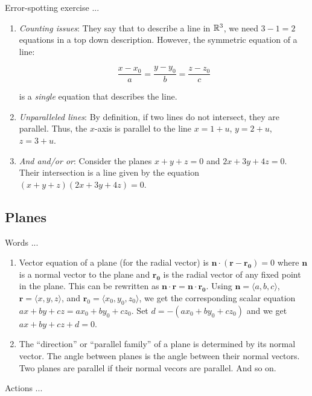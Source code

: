 \documentclass[10pt]{amsart}
\begin{document}
Error-spotting exercise ...

\begin{enumerate}
\item {\em Counting issues}: They say that to describe a line in
  $\mathbb{R}^3$, we need $3 - 1 = 2$ equations in a top down
  description. However, the symmetric equation of a line:

  $$\frac{x - x_0}{a} = \frac{y - y_0}{b} = \frac{z - z_0}{c}$$

  is a {\em single} equation that describes the line.
\item {\em Unparalleled lines}: By definition, if two lines do not
  intersect, they are parallel. Thus, the $x$-axis is parallel to the
  line $x = 1 + u$, $y = 2 + u$, $z = 3 + u$.
\item {\em And and/or or}: Consider the planes $x + y + z = 0$ and $2x
  + 3y + 4z = 0$. Their intersection is a line given by the equation
  $(x + y +z)(2x + 3y + 4z) = 0$.
\end{enumerate}

\subsection{Planes}

Words ...

\begin{enumerate}
\item Vector equation of a plane (for the radial vector) is
  $\mathbf{n} \cdot (\mathbf{r} - \mathbf{r_0}) = 0$ where
  $\mathbf{n}$ is a normal vector to the plane and $\mathbf{r_0}$ is
  the radial vector of any fixed point in the plane. This can be
  rewritten as $\mathbf{n} \cdot \mathbf{r} = \mathbf{n} \cdot
  \mathbf{r_0}$. Using $\mathbf{n} = \langle a,b,c \rangle$,
  $\mathbf{r} = \langle x,y,z \rangle$, and $\mathbf{r}_0 = \langle
  x_0,y_0,z_0 \rangle$, we get the corresponding scalar equation $ax +
  by + cz = ax_0 + by_0 + cz_0$. Set $d = -(ax_0 + by_0 + cz_0)$ and
  we get $ax + by + cz + d = 0$.
\item The ``direction'' or ``parallel family'' of a plane is
  determined by its normal vector. The angle between planes is the
  angle between their normal vectors. Two planes are parallel if their
  normal vecors are parallel. And so on.
\end{enumerate}

Actions ...
\end{document}
